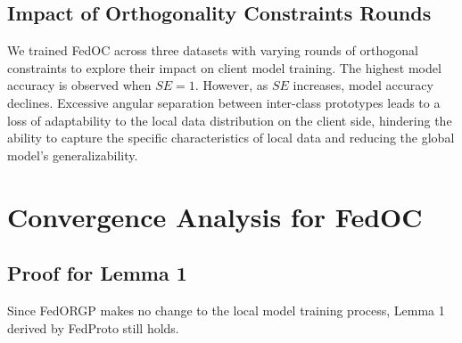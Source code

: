\subsection{Impact of Orthogonality Constraints Rounds}
We trained FedOC across three datasets with varying rounds of orthogonal constraints to explore their impact on client model training. The highest model accuracy is observed when $SE=1$. However, as $SE$ increases, model accuracy declines. Excessive angular separation between inter-class prototypes leads to a loss of adaptability to the local data distribution on the client side, hindering the ability to capture the specific characteristics of local data and reducing the global model's generalizability.

\begin{table}[ht]
\caption{The test accuracy (\%) of FedOC across three datasets in the pathological setting is used to evaluate the impact of server epochs on client model performance.}
\label{tab:test various server epochs} %
\centering
{}
\end{table}

\section{Convergence Analysis for FedOC}
\label{sec:convergence analysis}

\subsection{Proof for Lemma 1}
Since FedORGP makes no change to the local model training process, Lemma 1 derived by FedProto still holds.

